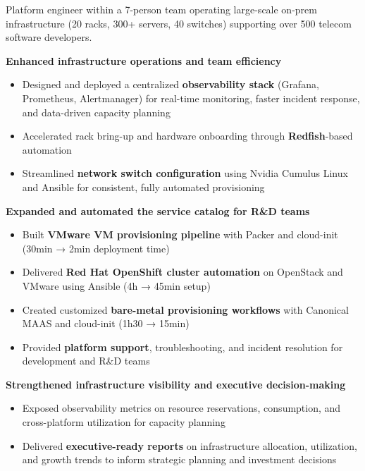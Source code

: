 

Platform engineer within a 7-person team operating large-scale on-prem infrastructure (20 racks, 300+ servers, 40 switches) supporting over 500 telecom software developers.

\textbf{Enhanced infrastructure operations and team efficiency}
\begin{itemize}
  \item Designed and deployed a centralized \textbf{observability stack} (Grafana, Prometheus, Alertmanager) for real-time monitoring, faster incident response, and data-driven capacity planning
  \item Accelerated rack bring-up and hardware onboarding through \textbf{Redfish}-based automation
  \item Streamlined \textbf{network switch configuration} using Nvidia Cumulus Linux and Ansible for consistent, fully automated provisioning
\end{itemize}

\textbf{Expanded and automated the service catalog for R\&D teams}
\begin{itemize}
  \item Built \textbf{VMware VM provisioning pipeline} with Packer and cloud-init (30min → 2min deployment time)
  \item Delivered \textbf{Red Hat OpenShift cluster automation} on OpenStack and VMware using Ansible (4h → 45min setup)
  \item Created customized \textbf{bare-metal provisioning workflows} with Canonical MAAS and cloud-init (1h30 → 15min)
  \item Provided \textbf{platform support}, troubleshooting, and incident resolution for development and R\&D teams
\end{itemize}

\textbf{Strengthened infrastructure visibility and executive decision-making}
\begin{itemize}
  \item Exposed observability metrics on resource reservations, consumption, and cross-platform utilization for capacity planning
  \item Delivered \textbf{executive-ready reports} on infrastructure allocation, utilization, and growth trends to inform strategic planning and investment decisions
\end{itemize}

